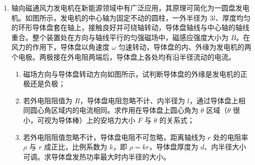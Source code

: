 \documentclass[\gkver]{gaokaozhenti}
\begin{document}
\begin{enumerate}
{联立得
$B = \frac{2mv\sin\theta}{qL}$
}

\item
轴向磁通风力发电机在新能源领域中有广泛应用，其原理可简化为一圆盘发电机。如图所示，发电机的中心轴为固定不动的圆柱，一外半径为 $3l$、厚度均匀的环形导体盘套在轴上，接触良好并可绕轴转动，导体盘轴线与中心轴的轴线重合。整个装置处在方向与轴线平行的匀强磁场中，磁感应强度大小为 $B$。在风力的作用下，导体盘以角速度 $\omega$ 匀速转动，导体盘的内、外缘为发电机的两个电极。两极接在外电阻两端后，导体盘上各处均有沿半径流动的电流。
\begin{enumerate}
\item
磁场方向与导体盘转动方向如图所示，试判断导体盘的外缘是发电机的正极还是负极；
\item
若外电阻阻值为 $R$，导体盘电阻忽略不计、内半径为 $l$，通过导体盘上相同圆心角区域内的电流相同。求作用在导体盘上圆心角为 $\theta$ 区域（$\theta$ 很小，可视为导体棒）上的安培力大小 $F$ 与 $\theta$ 的关系式；
\item
若外电阻阻值忽略不计，导体盘电阻不可忽略，距离轴线为 $r$ 处的电阻率 $\rho$ 与 $r$ 成正比，比例系数为 $k$，即 $\rho = kr$，导体盘厚度为 $d$、内半径大小可调。求导体盘发热功率最大时内半径的大小。
\end{enumerate}


\end{enumerate}
\end{document}
